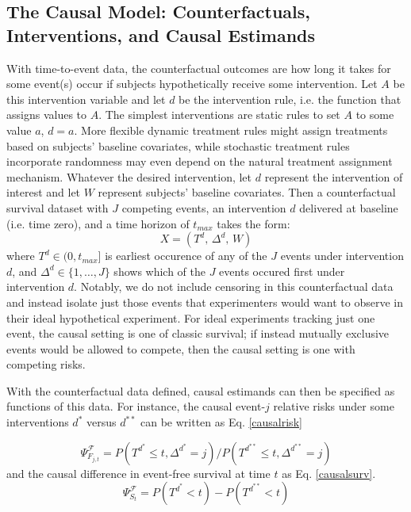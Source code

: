 \documentclass{report}
\newcommand{\1}{\ensuremath{\mathbf{1}}}
\newcommand{\jj}{\ensuremath{j}}
\renewcommand{\L}{\ensuremath{W}}
\newcommand{\F}{\ensuremath{\mathcal{F}}}
\begin{document}
\subsection{The Causal Model: Counterfactuals, Interventions, and Causal Estimands}
\label{sec:org9f45dd3}
With time-to-event data, the counterfactual outcomes are how long it takes for some event(s) occur if subjects hypothetically receive some intervention. Let \(A\) be this intervention variable and let \(d\) be the intervention rule, i.e. the function that assigns values to \(A\). The simplest interventions are static rules to set \(A\) to some value \(a\), \(d = a\). More flexible dynamic treatment rules might assign treatments based on subjects' baseline covariates, while stochastic treatment rules incorporate randomness may even depend on the natural treatment assignment mechanism. Whatever the desired intervention, let \(d\) represent the intervention of interest and let \(\L\) represent subjects' baseline covariates. Then a counterfactual survival dataset with \(J\) competing events, an intervention \(d\) delivered at baseline (i.e. time zero), and a time horizon of \(t_{max}\) takes the form:
\begin{equation}
 X = \left(T^d,\, \Delta^d,\, \L \right) \label{causaldata}
\end{equation}
where \(T^d \in (0, t_{max}]\) is earliest occurence of any of the \(J\) events under intervention \(d\), and \(\Delta^d \in \{1, \dots, J\}\) shows which of the \(J\) events occured first under intervention \(d\). Notably, we do not include censoring in this counterfactual data and instead isolate just those events that experimenters would want to observe in their ideal hypothetical experiment. For ideal experiments tracking just one event, the causal setting is one of classic survival; if instead mutually exclusive events would be allowed to compete, then the causal setting is one with competing risks. 

With the counterfactual data defined, causal estimands can then be specified as functions of this data. For instance, the causal event-\(\jj\) relative risks under some interventions \(d^*\) versus \(d^{**}\) can be written as Eq. \eqref{causalrisk} 

\begin{equation}
\Psi^\F_{F_{j,t}} = P(T^{d^*} \leq t, \Delta^{d^*} = j) / P(T^{d^{**}} \leq t, \Delta^{d^{**}} = j) \label{causalrisk}
\end{equation}
and the causal difference in event-free survival at time \(t\) as Eq. \eqref{causalsurv}.
\begin{equation}
\Psi^\F_{S_t} = P(T^{d^*} < t) - P(T^{d^{**}} < t) \label{causalsurv}
\end{equation}
\end{document}
